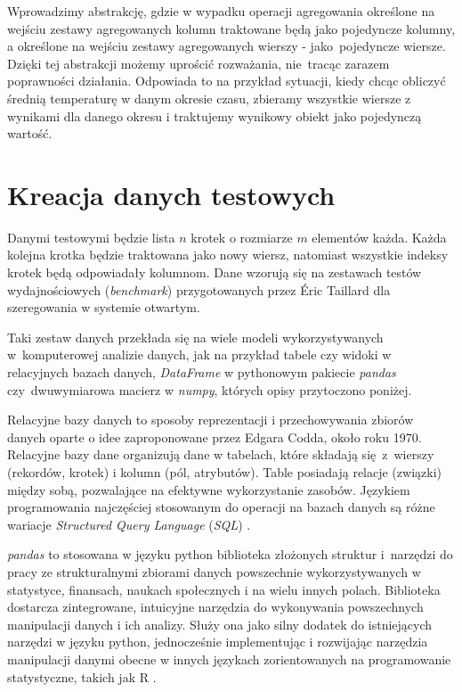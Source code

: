 \documentclass[brudnopis]{xmgr}
\begin{document}
Wprowadzimy abstrakcję, gdzie w wypadku operacji agregowania określone na wejściu zestawy agregowanych kolumn traktowane będą jako pojedyncze kolumny, a określone na wejściu zestawy agregowanych wierszy - jako~pojedyncze wiersze. Dzięki tej abstrakcji możemy uprościć rozważania, nie~tracąc zarazem poprawności działania. Odpowiada to na przykład sytuacji, kiedy chcąc obliczyć średnią temperaturę w danym okresie czasu, zbieramy wszystkie wiersze z wynikami dla danego okresu i traktujemy wynikowy obiekt jako pojedynczą wartość.


\section{Kreacja danych testowych}

Danymi testowymi będzie lista $n$ krotek o rozmiarze $m$ elementów każda.
Każda kolejna krotka będzie traktowana jako nowy wiersz, natomiast wszystkie indeksy krotek będą odpowiadały kolumnom. Dane wzorują się na zestawach testów wydajnościowych (\emph{benchmark}) przygotowanych przez Éric Taillard \cite{taillard1993benchmarks} dla szeregowania w systemie otwartym.
\medskip

Taki zestaw danych przekłada się na wiele modeli wykorzystywanych w~komputerowej analizie danych, jak na przykład tabele czy widoki w relacyjnych bazach danych, \emph{DataFrame} w pythonowym pakiecie \emph{pandas} czy~dwuwymiarowa macierz w \emph{numpy}, których opisy przytoczono poniżej.
\medskip

Relacyjne bazy danych to sposoby reprezentacji i przechowywania zbiorów danych oparte o idee zaproponowane przez Edgara Codda, około roku 1970. Relacyjne bazy dane organizują dane w tabelach, które składają się~z~wierszy (rekordów, krotek) i kolumn (pól, atrybutów). Table posiadają relacje (związki) między sobą, pozwalające na efektywne wykorzystanie zasobów. Językiem programowania najczęściej stosowanym do operacji na bazach danych są różne wariacje \emph{Structured Query Language} (\emph{SQL}) \cite{RDB1:2020:X} \cite{RDB2:2020:X} \cite{RDB3:2010:X}.
\medskip

\emph{pandas} to stosowana w języku python biblioteka złożonych struktur i~narzędzi do pracy ze strukturalnymi zbiorami danych powszechnie wykorzystywanych w statystyce, finansach, naukach społecznych i na wielu innych polach. Biblioteka dostarcza zintegrowane, intuicyjne narzędzia do wykonywania powszechnych manipulacji danych i ich analizy. Służy ona jako silny dodatek do istniejących narzędzi w języku python, jednocześnie implementując i rozwijając narzędzia manipulacji danymi obecne w innych językach zorientowanych na programowanie statystyczne, takich jak R \cite{PANDAS1:2011:X} \cite{PANDAS2:2020:X}.
\medskip
\end{document}
